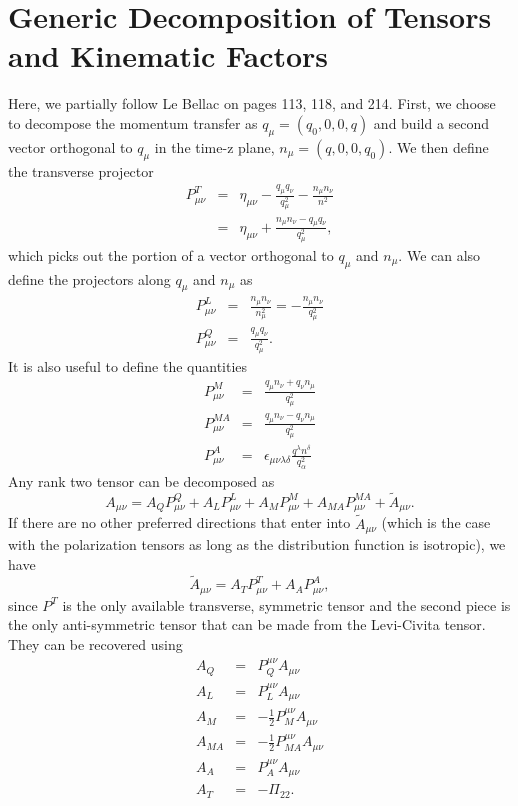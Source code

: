 \documentclass[12pt,letter]{article}
\begin{document}
\section{Generic Decomposition of Tensors and Kinematic Factors} 
Here, we partially follow Le Bellac on pages 113, 118, and 214. First, we choose to 
decompose the momentum transfer as $q_\mu = (q_0, 0, 0, q)$ and build a second 
vector orthogonal to $q_\mu$ in the time-z plane, $n_\mu = (q, 0, 0, q_0)$. We 
then define the transverse projector 
\begin{eqnarray}
P_{\mu \nu}^T &=& \eta_{\mu \nu} - \frac{q_\mu q_\nu}{q_\mu^2} 
- \frac{n_\mu n_\nu}{n^2} 
\nonumber\\
&=& \eta_{\mu \nu} + \frac{n_\mu n_\nu - q_\mu q_\nu}{q_\mu^2},
\end{eqnarray}
which picks out the portion of a vector orthogonal to $q_\mu$ and $n_\mu$. We 
can also define the projectors along $q_\mu$ and $n_\mu$ as
\begin{eqnarray}
P^L_{\mu \nu} &=&  \frac{n_\mu n_\nu}{n_\mu^2} = -\frac{n_\mu n_\nu}{q_\mu^2}  \\
P^Q_{\mu \nu} &=&  \frac{q_\mu q_\nu}{q_\mu^2}. 
\end{eqnarray}
It is also useful to define the quantities 
\begin{eqnarray}
P^M_{\mu \nu} &=&  \frac{q_\mu n_\nu + q_\nu n_\mu}{q_\mu^2} \\
P^{MA}_{\mu \nu} &=&  \frac{q_\mu n_\nu - q_\nu n_\mu}{q_\mu^2} \\
P^A_{\mu \nu} &=&  \epsilon_{\mu \nu \lambda \delta} 
\frac{q^\lambda n^\delta}{q_\alpha^2}
\end{eqnarray} 
Any rank two tensor can be decomposed  as 
\begin{equation}
A_{\mu\nu} = A_Q P^Q_{\mu \nu} + A_L P^L_{\mu \nu} 
+ A_M P^M_{\mu \nu} + A_{MA} P^{MA}_{\mu \nu} + \tilde A_{\mu \nu}.
\end{equation}
If there are no other preferred directions that enter into $\tilde A_{\mu \nu}$
(which is the case with the polarization tensors as long as the distribution
function is isotropic), we have 
\begin{equation}
\tilde A_{\mu \nu} = A_T P^T_{\mu \nu} + A_A P^A_{\mu \nu},
\end{equation} 
since $P^T$ is the only available transverse, symmetric tensor and the second 
piece is the only anti-symmetric tensor that can be made from the Levi-Civita 
tensor. They can be recovered using 
\begin{eqnarray}
A_Q &=& P_Q^{\mu \nu} A_{\mu \nu}\\
A_L &=& P_L^{\mu \nu} A_{\mu \nu}\\ 
A_M &=&-\frac{1}{2} P_M^{\mu \nu} A_{\mu \nu}\\
A_{MA} &=&-\frac{1}{2} P_{MA}^{\mu \nu} A_{\mu \nu}\\
A_A &=& P^{\mu \nu}_A A_{\mu \nu}\\
A_T &=&-\Pi_{22}.
\end{eqnarray}
\end{document}
